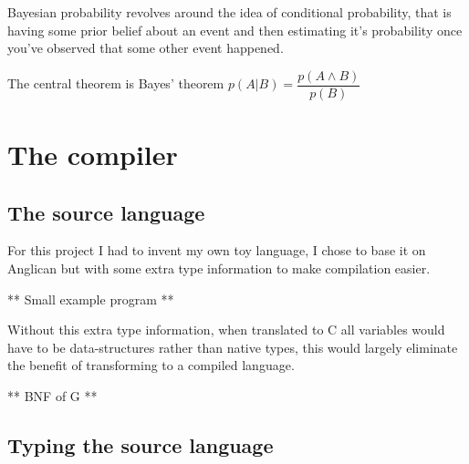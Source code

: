\documentclass[a4paper]{article}
\begin{document}
Bayesian probability revolves around the idea of conditional probability, that is having some prior belief about an event and then estimating it's probability once you've observed that some other event happened.

The central theorem is Bayes' theorem \(p(A | B) = \dfrac{p(A \land B)}{p(B)}\)




\section{The compiler}




\subsection{The source language}

For this project I had to invent my own toy language, I chose to base it on Anglican but with some extra type information to make compilation easier.

** Small example program **

Without this extra type information, when translated to C all variables would have to be data-structures rather than native types, this would largely eliminate the benefit of transforming to a compiled language.

** BNF of G **




\subsection{Typing the source language}
\end{document}
